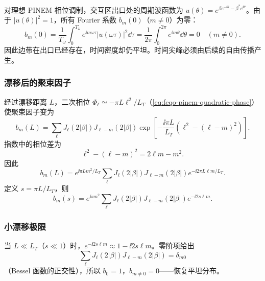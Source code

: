 对理想 PINEM 相位调制，交互区出口处的周期波函数为 $u(\theta)=e^{\beta e^{-\ii\theta}-\beta^*e^{\ii\theta}}$。由于 $|u(\theta)|^2=1$，所有 Fourier 系数 $b_m(0)$（$m\neq0$）为零：
\begin{equation}
b_m(0)=\frac{1}{T_\omega}\int_0^{T_\omega}e^{\ii m\omega\tau}|u(\omega\tau)|^2\dd\tau
=\frac{1}{2\pi}\int_0^{2\pi}e^{\ii m\theta}\dd\theta=0\quad(m\neq0).
\label{eq:feqo-pinem-flat-bunching}
\end{equation}
因此边带在出口已经存在，时间密度却仍平坦。时间尖峰必须由后续的自由传播产生。

\subsubsection{漂移后的聚束因子}

经过漂移距离 $L$，二次相位 $\Phi_\ell\simeq-\pi L\ell^2/L_T$（\cref{eq:feqo-pinem-quadratic-phase}）使聚束因子变为
\begin{equation}
b_m(L)=\sum_\ell J_\ell(2|\beta|)J_{\ell-m}(2|\beta|)
\exp\!\left[-\frac{\ii\pi L}{L_T}(\ell^2-(\ell-m)^2)\right].
\label{eq:feqo-bunching-after-drift}
\end{equation}
指数中的相位差为
\begin{equation}
\ell^2-(\ell-m)^2=2\ell m-m^2.
\label{eq:feqo-phase-difference}
\end{equation}
因此
\begin{equation}
b_m(L)=e^{\ii\pi L m^2/L_T}\sum_\ell J_\ell(2|\beta|)J_{\ell-m}(2|\beta|)
e^{-\ii 2\pi L\ell m/L_T}.
\label{eq:feqo-bunching-drift-explicit}
\end{equation}
定义 $s=\pi L/L_T$，则
\begin{equation}
b_m(s)=e^{\ii sm^2}\sum_\ell J_\ell(2|\beta|)J_{\ell-m}(2|\beta|)e^{-\ii 2s\ell m}.
\label{eq:feqo-bunching-s-form}
\end{equation}

\subsubsection{小漂移极限}

当 $L\ll L_T$（$s\ll 1$）时，$e^{-\ii 2s\ell m}\approx 1-\ii 2s\ell m$。零阶项给出
\begin{equation}
\sum_\ell J_\ell(2|\beta|)J_{\ell-m}(2|\beta|)=\delta_{m0}
\label{eq:feqo-bessel-orthogonality}
\end{equation}
（Bessel 函数的正交性），所以 $b_0=1$，$b_{m\neq0}=0$——恢复平坦分布。

